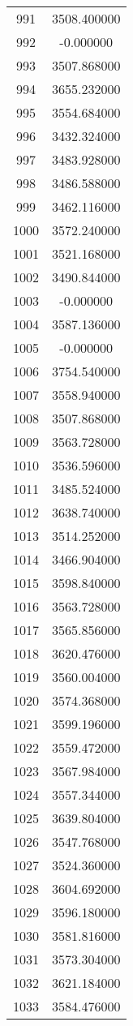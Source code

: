 \documentclass[12pt]{article}
\begin{document}
\begin{longtable}{@{}cc@{}}
991 & 3508.400000 \\
992 & -0.000000 \\
993 & 3507.868000 \\
994 & 3655.232000 \\
995 & 3554.684000 \\
996 & 3432.324000 \\
997 & 3483.928000 \\
998 & 3486.588000 \\
999 & 3462.116000 \\
1000 & 3572.240000 \\
1001 & 3521.168000 \\
1002 & 3490.844000 \\
1003 & -0.000000 \\
1004 & 3587.136000 \\
1005 & -0.000000 \\
1006 & 3754.540000 \\
1007 & 3558.940000 \\
1008 & 3507.868000 \\
1009 & 3563.728000 \\
1010 & 3536.596000 \\
1011 & 3485.524000 \\
1012 & 3638.740000 \\
1013 & 3514.252000 \\
1014 & 3466.904000 \\
1015 & 3598.840000 \\
1016 & 3563.728000 \\
1017 & 3565.856000 \\
1018 & 3620.476000 \\
1019 & 3560.004000 \\
1020 & 3574.368000 \\
1021 & 3599.196000 \\
1022 & 3559.472000 \\
1023 & 3567.984000 \\
1024 & 3557.344000 \\
1025 & 3639.804000 \\
1026 & 3547.768000 \\
1027 & 3524.360000 \\
1028 & 3604.692000 \\
1029 & 3596.180000 \\
1030 & 3581.816000 \\
1031 & 3573.304000 \\
1032 & 3621.184000 \\
1033 & 3584.476000 \\

\end{longtable}
\end{document}
